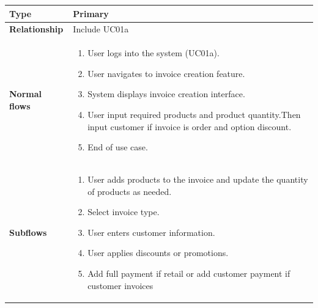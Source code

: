 \documentclass[../thesis.tex]{subfiles}
\begin{document}
\begin{center}
\begin{table}[H]
{\begin{tabular}[htbp]{|p{}|p{}|}
                \textbf{Type             }       & Primary                                                                                                                                                                                                                                                                                                                                            \\ \hline
                \textbf{Relationship        }    & Include UC01a                                                                                                                                                                                                                                                                                                                                      \\ \hline
                \textbf{Normal flows         }   & \begin{enumerate}
                                                       \item User logs into the system (UC01a).
                                                       \item User navigates to invoice creation feature.
                                                       \item System displays invoice creation interface.
                                                       \item User input required products and product quantity.Then input customer if invoice is order and option discount.
                                                       \item End of use case.
                                                   \end{enumerate}\\ \hline
                \textbf{Subflows              }  & \begin{enumerate}
                                                       \item User adds products to the invoice and update the quantity of products as needed.
                                                       \item Select invoice type.
                                                       \item  User enters customer information.
                                                       \item User applies discounts or promotions.
                                                       \item Add full payment if retail or add customer payment if customer invoices

\end{enumerate}
\end{tabular}}
\end{table}
\end{center}
\end{document}
